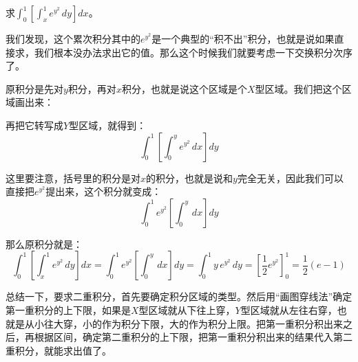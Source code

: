 \begin{myexample}
求$\int_{0}^{1} \left[ \int_{x}^{1} e^{y^{2}} \, dy \right] dx$。

我们发现，这个累次积分其中的$e^{y^{2}}$是一个典型的“积不出”积分，也就是说如果直接求，我们根本没办法求出它的值。那么这个时候我们就要考虑一下交换积分次序了。

原积分是先对$y$积分，再对$x$积分，也就是说这个区域是个$X$型区域。我们把这个区域画出来：
    
\begin{center}
\end{center}

再把它转写成$Y$型区域，就得到：
\[
\int_{0}^{1} \left[ \int_{0}^{y} e^{y^{2}} \, dx \right] dy
\]

这里要注意，括号里的积分是对$x$的积分，也就是说和$y$完全无关，因此我们可以直接把$e^{y^{2}}$提出来，这个积分就变成：
\[
\int_{0}^{1} e^{y^{2}} \left[ \int_{0}^{y} \, dx \right] dy
\]

那么原积分就是：
\[
\int_{0}^{1} \left[ \int_{x}^{1} e^{y^{2}} \, dy \right] dx=\int_{0}^{1} e^{y^{2}} \left[ \int_{0}^{y} \, dx \right] dy=\int_{0}^{1} y \, e^{y^{2}} \, dy=\left[\frac{1}{2}e^{y^2}\right]_{0}^{1}=\frac{1}{2} (e - 1)
\]
\end{myexample}

总结一下，要求二重积分，首先要确定积分区域的类型。然后用“画图穿线法”确定第一重积分的上下限，如果是$X$型区域就从下往上穿，$Y$型区域就从左往右穿，也就是从小往大穿，小的作为积分下限，大的作为积分上限。把第一重积分积出来之后，再根据区间，确定第二重积分的上下限，把第一重积分积出来的结果代入第二重积分，就能求出值了。


